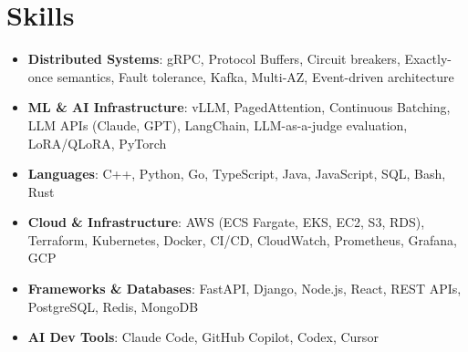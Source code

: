 \documentclass[letterpaper,11pt]{article}
\newcommand{\resumeSubHeadingListStart}{\begin{itemize}[leftmargin=0.15in, label={}]}
\newcommand{\resumeSubHeadingListEnd}{\end{itemize}}
\newcommand{\resumeSkillHeading}[2]{%
  \item\small{\textbf{#1}: #2 \vspace{-9pt}}%
}
\begin{document}
\section{Skills}
  \resumeSubHeadingListStart
    \resumeSkillHeading{Distributed Systems}{gRPC, Protocol Buffers, Circuit breakers, Exactly-once semantics, Fault tolerance, Kafka, Multi-AZ, Event-driven architecture}
    \resumeSkillHeading{ML \& AI Infrastructure}{vLLM, PagedAttention, Continuous Batching, LLM APIs (Claude, GPT), LangChain, LLM-as-a-judge evaluation, LoRA/QLoRA, PyTorch}
    \resumeSkillHeading{Languages}{C++, Python, Go, TypeScript, Java, JavaScript, SQL, Bash, Rust}
    \resumeSkillHeading{Cloud \& Infrastructure}{AWS (ECS Fargate, EKS, EC2, S3, RDS), Terraform, Kubernetes, Docker, CI/CD, CloudWatch, Prometheus, Grafana, GCP}
    \resumeSkillHeading{Frameworks \& Databases}{FastAPI, Django, Node.js, React, REST APIs, PostgreSQL, Redis, MongoDB}
    \resumeSkillHeading{AI Dev Tools}{Claude Code, GitHub Copilot, Codex, Cursor}
  \resumeSubHeadingListEnd
\end{document}
